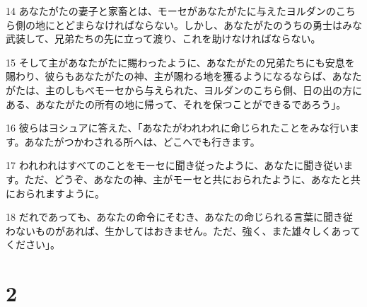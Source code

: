 \par 14 あなたがたの妻子と家畜とは、モーセがあなたがたに与えたヨルダンのこちら側の地にとどまらなければならない。しかし、あなたがたのうちの勇士はみな武装して、兄弟たちの先に立って渡り、これを助けなければならない。
\par 15 そして主があなたがたに賜わったように、あなたがたの兄弟たちにも安息を賜わり、彼らもあなたがたの神、主が賜わる地を獲るようになるならば、あなたがたは、主のしもべモーセから与えられた、ヨルダンのこちら側、日の出の方にある、あなたがたの所有の地に帰って、それを保つことができるであろう」。
\par 16 彼らはヨシュアに答えた、「あなたがわれわれに命じられたことをみな行います。あなたがつかわされる所へは、どこへでも行きます。
\par 17 われわれはすべてのことをモーセに聞き従ったように、あなたに聞き従います。ただ、どうぞ、あなたの神、主がモーセと共におられたように、あなたと共におられますように。
\par 18 だれであっても、あなたの命令にそむき、あなたの命じられる言葉に聞き従わないものがあれば、生かしてはおきません。ただ、強く、また雄々しくあってください」。

\chapter{2}

